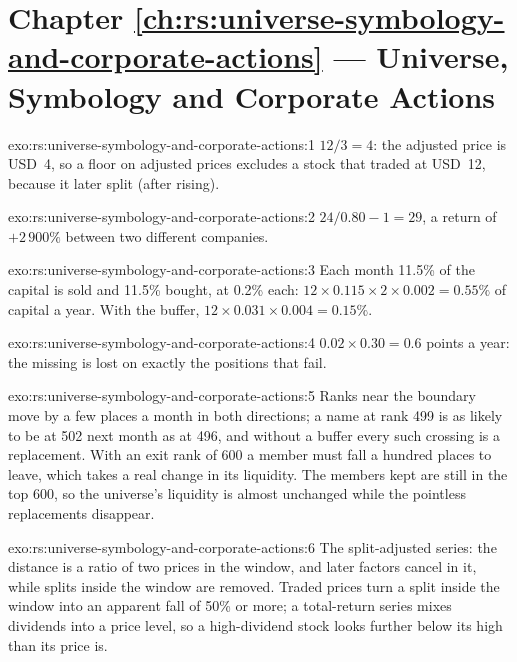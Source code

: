 \section*{Chapter \ref{ch:rs:universe-symbology-and-corporate-actions} --- Universe, Symbology and Corporate Actions}

\begin{solution}{exo:rs:universe-symbology-and-corporate-actions:1}
$12/3 = 4$: the adjusted price is USD~4, so a floor on adjusted prices excludes a stock that traded at USD~12, because it later
split (after rising).
\end{solution}

\begin{solution}{exo:rs:universe-symbology-and-corporate-actions:2}
$24/0.80 - 1 = 29$, a return of $+2\,900\%$ between two different companies.
\end{solution}

\begin{solution}{exo:rs:universe-symbology-and-corporate-actions:3}
Each month 11.5\% of the capital is sold and 11.5\% bought, at 0.2\% each: $12 \times 0.115 \times 2 \times 0.002 = 0.55\%$ of capital a
year. With the buffer, $12 \times 0.031 \times 0.004 = 0.15\%$.
\end{solution}

\begin{solution}{exo:rs:universe-symbology-and-corporate-actions:4}
$0.02 \times 0.30 = 0.6$ points a year: the missing  is lost on exactly the positions that fail.
\end{solution}

\begin{solution}{exo:rs:universe-symbology-and-corporate-actions:5}
Ranks near the boundary move by a few places a month in both directions; a name at rank 499 is as likely to be at 502 next month as
at 496, and without a buffer every such crossing is a replacement. With an exit rank of 600 a member must fall a hundred places to
leave, which takes a real change in its liquidity. The members kept are still in the top 600, so the universe's liquidity is almost
unchanged while the pointless replacements disappear.
\end{solution}

\begin{solution}{exo:rs:universe-symbology-and-corporate-actions:6}
The split-adjusted series: the distance is a ratio of two prices in the window, and later factors cancel in it, while splits inside
the window are removed. Traded prices turn a split inside the window into an apparent fall of 50\% or more; a total-return series
mixes dividends into a price level, so a high-dividend stock looks further below its high than its price is.
\end{solution}

